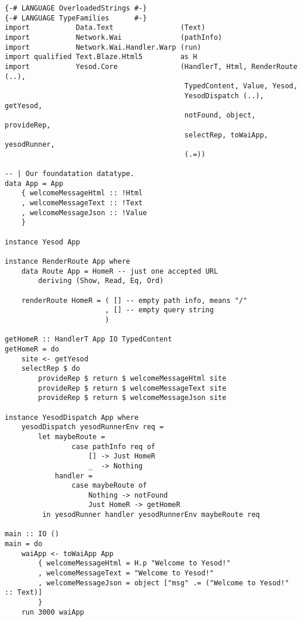 \begin{lstlisting}
{-# LANGUAGE OverloadedStrings #-}
{-# LANGUAGE TypeFamilies      #-}
import           Data.Text                (Text)
import           Network.Wai              (pathInfo)
import           Network.Wai.Handler.Warp (run)
import qualified Text.Blaze.Html5         as H
import           Yesod.Core               (HandlerT, Html, RenderRoute (..),
                                           TypedContent, Value, Yesod,
                                           YesodDispatch (..), getYesod,
                                           notFound, object, provideRep,
                                           selectRep, toWaiApp, yesodRunner,
                                           (.=))

-- | Our foundatation datatype.
data App = App
    { welcomeMessageHtml :: !Html
    , welcomeMessageText :: !Text
    , welcomeMessageJson :: !Value
    }

instance Yesod App

instance RenderRoute App where
    data Route App = HomeR -- just one accepted URL
        deriving (Show, Read, Eq, Ord)

    renderRoute HomeR = ( [] -- empty path info, means "/"
                        , [] -- empty query string
                        )

getHomeR :: HandlerT App IO TypedContent
getHomeR = do
    site <- getYesod
    selectRep $ do
        provideRep $ return $ welcomeMessageHtml site
        provideRep $ return $ welcomeMessageText site
        provideRep $ return $ welcomeMessageJson site

instance YesodDispatch App where
    yesodDispatch yesodRunnerEnv req =
        let maybeRoute =
                case pathInfo req of
                    [] -> Just HomeR
                    _  -> Nothing
            handler =
                case maybeRoute of
                    Nothing -> notFound
                    Just HomeR -> getHomeR
         in yesodRunner handler yesodRunnerEnv maybeRoute req

main :: IO ()
main = do
    waiApp <- toWaiApp App
        { welcomeMessageHtml = H.p "Welcome to Yesod!"
        , welcomeMessageText = "Welcome to Yesod!"
        , welcomeMessageJson = object ["msg" .= ("Welcome to Yesod!" :: Text)]
        }
    run 3000 waiApp
\end{lstlisting}

